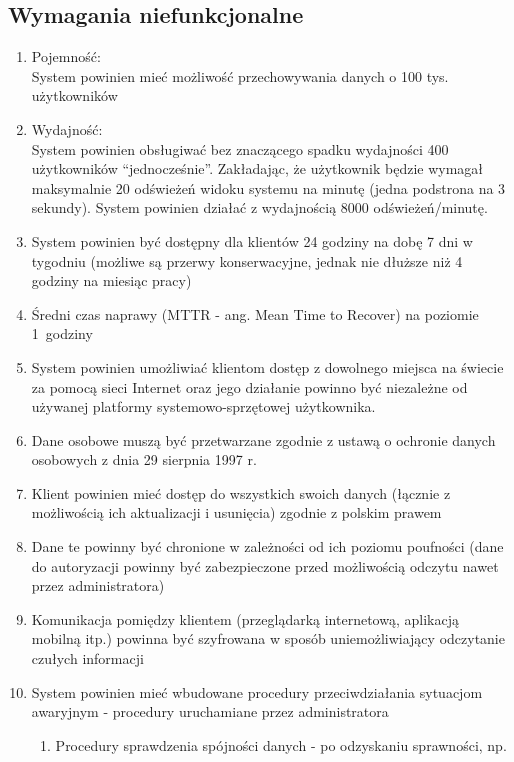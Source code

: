 \newpage
\subsection{Wymagania niefunkcjonalne}

\begin{enumerate}
  \item Pojemność: \\ 
  System powinien mieć możliwość przechowywania danych o 100 tys.
  użytkowników 
  \item Wydajność: \\ 
  System powinien obsługiwać bez znaczącego spadku wydajności 400
  użytkowników ``jednocześnie''. Zakładając, że użytkownik będzie wymagał
  maksymalnie 20 odświeżeń widoku systemu na minutę (jedna podstrona na 3
  sekundy). System powinien działać z wydajnością 8000 odświeżeń/minutę. 
  \item System powinien być dostępny dla klientów 24 godziny na dobę 7 dni w
  tygodniu (możliwe są przerwy konserwacyjne, jednak nie dłuższe niż 4 godziny na miesiąc pracy) 
  \item Średni czas naprawy (MTTR - ang. Mean Time to Recover) na poziomie
  1~godziny
  \item System powinien umożliwiać klientom dostęp z dowolnego miejsca na
  świecie za pomocą sieci Internet oraz jego działanie powinno być niezależne od
  używanej platformy systemowo-sprzętowej użytkownika.
  \item Dane osobowe muszą być przetwarzane zgodnie z ustawą o ochronie danych
  osobowych z dnia 29 sierpnia 1997 r. 
  \item Klient powinien mieć dostęp do wszystkich swoich danych (łącznie z
  możliwością ich aktualizacji i usunięcia) zgodnie z polskim prawem
  \item Dane te powinny być chronione w zależności od ich poziomu poufności
  (dane do autoryzacji powinny być zabezpieczone przed możliwością odczytu nawet
  przez administratora) 
  \item Komunikacja pomiędzy klientem (przeglądarką internetową, aplikacją
  mobilną itp.) powinna być szyfrowana w sposób uniemożliwiający odczytanie czułych informacji
  \item System powinien mieć wbudowane procedury przeciwdziałania sytuacjom
  awaryjnym - procedury uruchamiane przez administratora
  \begin{enumerate}
    \item Procedury sprawdzenia spójności danych - po odzyskaniu sprawności, np.

\end{enumerate}
\end{enumerate}
